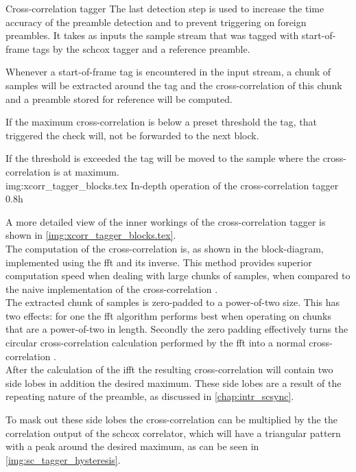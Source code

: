 \begin{subchapter}{Cross-correlation tagger}
  The last detection step is used to increase the time accuracy
  of the preamble detection and to prevent triggering on foreign
  preambles.
  It takes as inputs the sample stream that was tagged with
  start-of-frame tags by the \acrshort{schcox} tagger
  and a reference preamble.

  Whenever a start-of-frame tag is encountered in the input stream,
  a chunk of samples will be extracted around the tag and the
  cross-correlation of this chunk and a preamble stored for reference
  will be computed.

  If the maximum cross-correlation is below a preset threshold
  the tag, that triggered the check will, not be forwarded to the
  next block.

  If the threshold is exceeded the tag will be moved to the sample
  where the cross-correlation is at maximum. \\

               {img:xcorr_tagger_blocks.tex}
               {In-depth operation of the cross-correlation tagger}
               {0.8}{h}

  A more detailed view of the inner workings of the cross-correlation
  tagger is shown in \autoref{img:xcorr_tagger_blocks.tex}. \\

  The computation of the cross-correlation is, as shown in the
  block-diagram, implemented using the \acrlong{fft} and its inverse.
  This method provides superior computation speed when dealing
  with large chunks of samples, when compared to the naive implementation
  of the cross-correlation \cite{kammeyer2012}. \\

  The extracted chunk of samples is zero-padded to a power-of-two size.
  This has two effects: for one the \acrshort{fft} algorithm performs
  best when operating on chunks that are a power-of-two in length.
  Secondly the zero padding effectively turns the circular cross-correlation
  calculation performed by the \acrshort{fft} into a normal cross-correlation
  \cite{kammeyer2012}. \\

  After the calculation of the \acrshort{ifft} the resulting cross-correlation
  will contain two side lobes in addition the desired maximum.
  These side lobes are a result of the repeating nature of the preamble, as
  discussed in \autoref{chap:intr_scsync}.

  To mask out these side lobes the cross-correlation can be multiplied by
  the the correlation output of the \acrlong{schcox} correlator,
  which will have a triangular pattern with a peak around the desired
  maximum, as can be seen in \autoref{img:sc_tagger_hysteresis}.
\end{subchapter}

